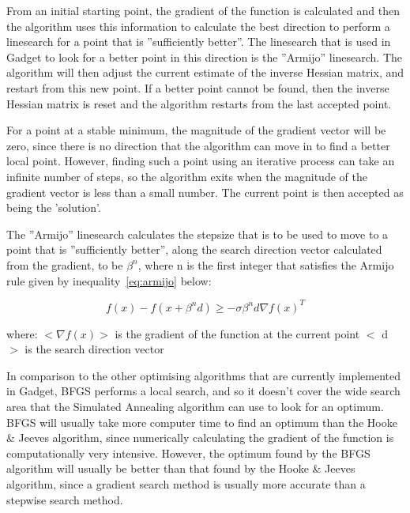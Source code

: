 \documentclass[10pt,twoside]{book}
\begin{document}
\bigskip
From an initial starting point, the gradient of the function is calculated and then the algorithm uses this information to calculate the best direction to perform a linesearch for a point that is ''sufficiently better''.  The linesearch that is used in Gadget to look for a better point in this direction is the ''Armijo'' linesearch.  The algorithm will then adjust the current estimate of the inverse Hessian matrix, and restart from this new point.  If a better point cannot be found, then the inverse Hessian matrix is reset and the algorithm restarts from the last accepted point.

\bigskip
For a point at a stable minimum, the magnitude of the gradient vector will be zero, since there is no direction that the algorithm can move in to find a better local point.  However, finding such a point using an iterative process can take an infinite number of steps, so the algorithm exits when the magnitude of the gradient vector is less than a small number.  The current point is then accepted as being the 'solution'.

\bigskip
The ''Armijo'' linesearch calculates the stepsize that is to be used to move to a point that is ''sufficiently better'', along the search direction vector calculated from the gradient, to be $\beta^n$, where n is the first integer that satisfies the Armijo rule given by inequality~\ref{eq:armijo} below:

\begin{equation}\label{eq:armijo}
f(x) - f(x + \beta^{n}d) \geq - \sigma \beta^{n}d \nabla f(x) ^{T}
\end{equation}

where:\newline
$<\nabla f(x)>$ is the gradient of the function at the current point\newline
$<$ d $>$ is the search direction vector

\bigskip
In comparison to the other optimising algorithms that are currently implemented in Gadget, BFGS performs a local search, and so it doesn't cover the wide search area that the Simulated Annealing algorithm can use to look for an optimum.  BFGS will usually take more computer time to find an optimum than the Hooke \& Jeeves algorithm, since numerically calculating the gradient of the function is computationally very intensive.  However, the optimum found by the BFGS algorithm will usually be better than that found by the Hooke \& Jeeves algorithm, since a gradient search method is usually more accurate than a stepwise search method.
\end{document}

